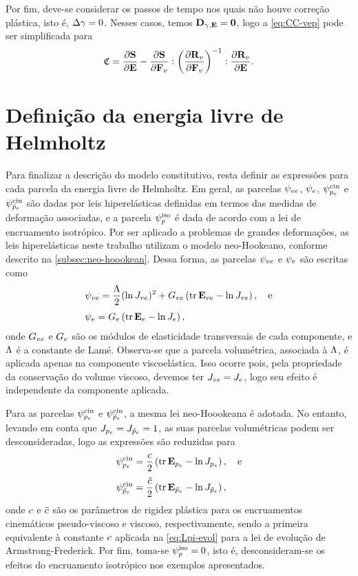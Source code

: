 \documentclass[Tese.tex]{subfiles}
\begin{document}
{Por fim, deve-se considerar os passos de tempo nos quais não houve correção plástica, isto é, $\Delta{\gamma}=0$. Nesses casos, temos $\mathbf{D}_{\gamma,\mathbf{E}}=\mathbf{0}$, logo a \cref{eq:CC-vep} pode ser simplificada para
\begin{equation}
\mathfrak{C} = \dfrac{\partial\mathbf{S}}{\partial\mathbf{E}} - \dfrac{\partial\mathbf{S}}{\partial\mathbf{F}_v}:\left(\dfrac{\partial\mathbf{R}_v}{\partial\mathbf{F}_v}\right)^{-1}:\dfrac{\partial\mathbf{R}_v}{\partial\mathbf{E}}.
\end{equation}

\aquiii
\section{Definição da energia livre de Helmholtz}\label{sec:helmholtz-vep}

Para finalizar a descrição do modelo constitutivo, resta definir as expressões para cada parcela da energia livre de Helmholtz. Em geral, as parcelas $\psi_{ve}$, $\psi_e$, $\psi_{p_e}^\text{cin}$ e $\psi_{\tilde{p}_e}^\text{cin}$ são dadas por leis hiperelásticas definidas em termos das medidas de deformação associadas, e a parcela $\psi_p^\text{iso}$ é dada de acordo com a lei de encruamento isotrópico. Por ser aplicado a problemas de grandes deformações, as leis hiperelásticas neste trabalho utilizam o modelo neo-Hookeano, conforme descrito na \autoref{subsec:neo-hoookean}. Dessa forma, as parcelas $\psi_{ve}$ e $\psi_e$ são escritas como
\begin{align}
& \psi_{ve} = \dfrac{\Lambda}{2}(\ln J_{ve})^2 + G_{ve}\left(\text{tr}\,\mathbf{E}_{ve} - \ln J_{ve}\right) ,\text{\quad e}\label{eq:helmholtzve}\\[0.1cm]
& \psi_e = {G_e}\left(\text{tr}\,\mathbf{E}_e - \ln J_e\right),\label{eq:helmholtze}
\end{align}
onde $G_{ve}$ e $G_e$ são os módulos de elasticidade transversais de cada componente, e $\Lambda$ é a constante de Lamé. Observa-se que a parcela volumétrica, associada à $\Lambda$, é aplicada apenas na componente viscoelástica. Isso ocorre pois, pela propriedade da conservação do volume viscoso, devemos ter $J_{ve}=J_e$, logo seu efeito é independente da componente aplicada.

Para as parcelas $\psi_{p_e}^\text{cin}$ e $\psi_{\tilde{p}_e}^\text{cin}$, a mesma lei neo-Hoookeana é adotada. No entanto, levando em conta que $J_{p_e}=J_{\tilde{p}_e}=1$, as suas parcelas volumétricas podem ser desconsideradas, logo as expressões são reduzidas para
\begin{align}
&\psi_{p_e}^\text{cin} = \dfrac{c}{2}\left(\text{tr}\,\mathbf{E}_{p_e} - \ln J_{p_e}\right),\text{\quad e}\label{eq:helmholtzkin}\\[0.1cm]
&\psi_{\tilde{p}_e}^\text{cin} = \dfrac{\tilde{c}}{2}\left(\text{tr}\,\mathbf{E}_{\tilde{p}_e} - \ln J_{\tilde{p}_e}\right),\label{eq:helmholtzkinv}
\end{align}
onde $c$ e $\tilde{c}$ são os parâmetros de rigidez plástica para os encruamentos cinemáticos pseudo-viscoso e viscoso, respectivamente, sendo a primeira equivalente à constante $c$ aplicada na \cref{eq:Lpi-evol} para a lei de evolução de Armstrong-Frederick. Por fim, toma-se $\psi_p^\text{iso} = 0$, isto é, desconsideram-se os efeitos do encruamento isotrópico nos exemplos apresentados.

}
\end{document}
